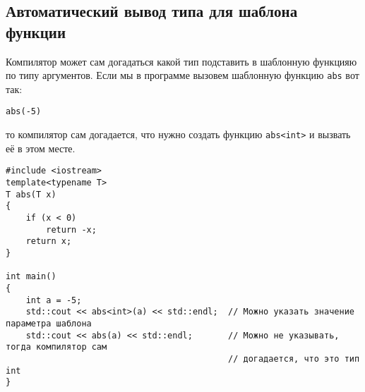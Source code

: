\documentclass{article}
\begin{document}
\newpage
\subsection*{Автоматический вывод типа для шаблона функции}
Компилятор может сам догадаться какой тип подставить в шаблонную функцияю по типу аргументов. Если мы в программе вызовем шаблонную функцию \texttt{abs} вот так:
\begin{lstlisting}
abs(-5)
\end{lstlisting}
то компилятор сам догадается, что нужно создать функцию \texttt{abs<int>} и вызвать её в этом месте.
\begin{lstlisting}
#include <iostream>
template<typename T>
T abs(T x)
{
	if (x < 0)
		return -x;
	return x;
}

int main()
{
	int a = -5;
	std::cout << abs<int>(a) << std::endl;  // Можно указать значение параметра шаблона
	std::cout << abs(a) << std::endl;       // Можно не указывать, тогда компилятор сам
	                                        // догадается, что это тип int
}
\end{lstlisting}
\end{document}
